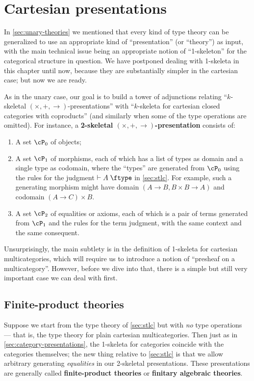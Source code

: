 \section{Cartesian presentations}
\label{sec:cartesian-presentations}

In \cref{sec:unary-theories} we mentioned that every kind of type theory can be generalized to use an appropriate kind of ``presentation'' (or ``theory'') as input, with the main technical issue being an appropriate notion of ``1-skeleton'' for the categorical structure in question.
We have postponed dealing with 1-skeleta in this chapter until now, because they are substantially simpler in the cartesian case; but now we are ready.

As in the unary case, our goal is to build a tower of adjunctions relating ``$k$-skeletal $(\times,+,\to)$-presentations'' with ``$k$-skeleta for cartesian closed categories with coproducts'' (and similarly when some of the type operations are omitted).
For instance, a \textbf{2-skeletal $(\times,+,\to)$-presentation} consists of:
\begin{enumerate}
\item A set $\cP_0$ of objects;
\item A set $\cP_1$ of morphisms, each of which has a list of types as domain and a single type as codomain, where the ``types'' are generated from $\cP_0$ using the rules for the judgment $\types A\type$ in \cref{sec:stlc}.
  For example, such a generating morphism might have domain $(A\to B, B\times B\to A)$ and codomain $(A\to C)\times B$.
\item A set $\cP_2$ of equalities or axioms, each of which is a pair of terms generated from $\cP_1$ and the rules for the term judgment, with the same context and the same consequent.
\end{enumerate}

Unsurprisingly, the main subtlety is in the definition of 1-skeleta for cartesian multicategories, which will require us to introduce a notion of ``presheaf on a multicategory''.
However, before we dive into that, there is a simple but still very important case we can deal with first.


\subsection{Finite-product theories}
\label{sec:fp-theories}

Suppose we start from the type theory of \cref{sec:stlc} but with \emph{no} type operations --- that is, the type theory for plain cartesian multicategories.
Then just as in \cref{sec:category-presentations}, the 1-skeleta for categories coincide with the categories themselves; the new thing relative to \cref{sec:stlc} is that we allow arbitrary generating \emph{equalities} in our 2-skeletal presentations.
These presentations are generally called \textbf{finite-product theories} or \textbf{finitary algebraic theories}.


